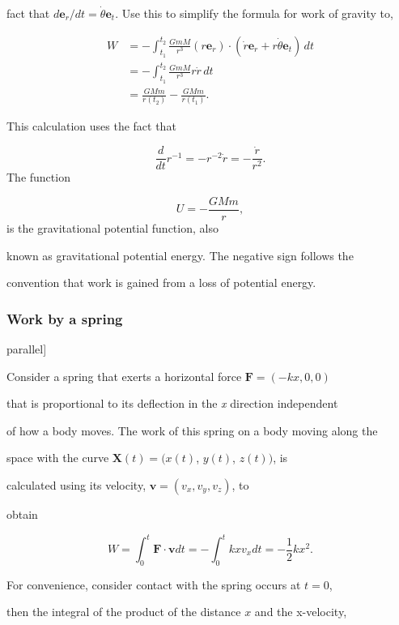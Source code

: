 fact that $d \mathbf{e} _r/dt  = \dot{\theta}\mathbf{e} _t$. Use this to simplify the formula for work of gravity to,


\begin{align}
W &= -\int^{t_2} _{t_1}\frac{GmM}{r^3}(r\mathbf{e} _r)\cdot(\dot{r}\mathbf{e} _r + r\dot{\theta}\mathbf{e} _t)\,dt \\&= -\int^{t_2} _{t_1}\frac{GmM}{r^3}r\dot{r}\,dt \\&= \frac{GMm}{r(t_2)} - \frac{GMm}{r(t_1)}.
\end{align}


This calculation uses the fact that


\[
\frac{d}{dt}r^{-1}=-r^{-2}\dot{r}=-\frac{\dot{r}}{r^2}.
\] The function


\[
U=-\frac{GMm}{r},
\] is the gravitational potential function, also

known as gravitational potential energy. The negative sign follows the

convention that work is gained from a loss of potential energy.


\subsubsection{Work by a spring}
\label{sss:work-1088}



parallel]


Consider a spring that exerts a horizontal force $\mathbf{F} = (-kx, 0, 0)$

that is proportional to its deflection in the \textit{x} direction independent

of how a body moves. The work of this spring on a body moving along the

space with the curve $\mathbf{X}(t) = (x(t)$, $y(t)$, $z(t))$, is

calculated using its velocity, $\mathbf{v} = (v_x, v_y, v_z)$, to

obtain


\[
W=\int_0^t\mathbf{F}\cdot\mathbf{v}dt =-\int_0^tkx v_x dt = -\frac{1}{2}kx^2.
\]

For convenience, consider contact with the spring occurs at $t = 0$,

then the integral of the product of the distance $x$ and the x-velocity,

